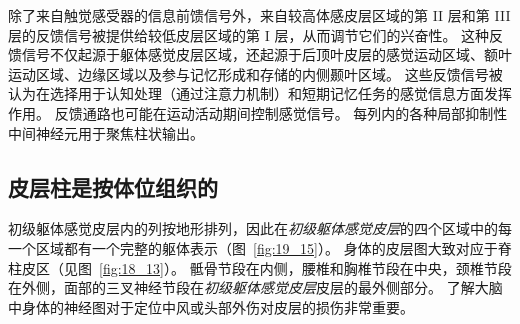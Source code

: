 除了来自触觉感受器的信息前馈信号外，来自较高体感皮层区域的第 II 层和第 III 层的反馈信号被提供给较低皮层区域的第 I 层，从而调节它们的兴奋性。
这种反馈信号不仅起源于躯体感觉皮层区域，还起源于后顶叶皮层的感觉运动区域、额叶运动区域、边缘区域以及参与记忆形成和存储的内侧颞叶区域。
这些反馈信号被认为在选择用于认知处理（通过注意力机制）和短期记忆任务的感觉信息方面发挥作用。
反馈通路也可能在运动活动期间控制感觉信号。
每列内的各种局部抑制性中间神经元用于聚焦柱状输出。



\subsection{皮层柱是按体位组织的}

初级躯体感觉皮层内的列按地形排列，因此在\textit{初级躯体感觉皮层}的四个区域中的每一个区域都有一个完整的躯体表示（图~\ref{fig:19_15}）。
身体的皮层图大致对应于脊柱皮区（见图~\ref{fig:18_13}）。
骶骨节段在内侧，腰椎和胸椎节段在中央，颈椎节段在外侧，面部的三叉神经节段在\textit{初级躯体感觉皮层}皮层的最外侧部分。
了解大脑中身体的神经图对于定位中风或头部外伤对皮层的损伤非常重要。


